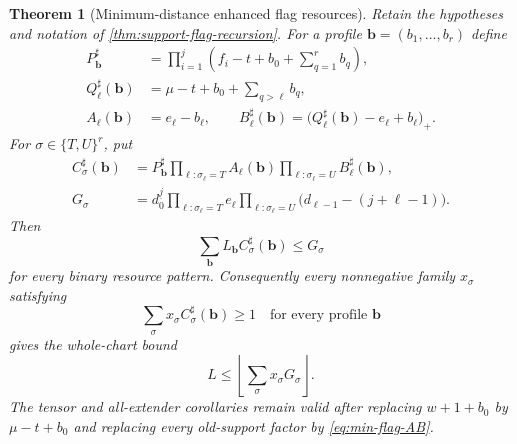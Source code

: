 \documentclass[11pt,a4paper]{amsart}
\numberwithin{equation}{section}
\newtheorem{theorem}{Theorem}[section]
\theoremstyle{remark}
\begin{document}
\begin{theorem}[Minimum-distance enhanced flag resources]
\label{thm:min-distance-flag-resources}
Retain the hypotheses and notation of \cref{thm:support-flag-recursion}.  For a profile $\mathbf b=(b_1,\ldots,b_r)$ define
\begin{align}
 P_{\mathbf b}^{\sharp}
 &=\prod_{i=1}^{j}
 \left(f_i-t+b_0+\sum_{q=1}^{r}b_q\right),\label{eq:min-flag-P}\\
 Q_{\ell}^{\sharp}(\mathbf b)
 &=\mu-t+b_0+\sum_{q>\ell}b_q,\label{eq:min-flag-Q}\\
 A_\ell(\mathbf b)&=e_\ell-b_\ell,
 \qquad
 B_{\ell}^{\sharp}(\mathbf b)
 =\bigl(Q_{\ell}^{\sharp}(\mathbf b)-e_\ell+b_\ell\bigr)_+ .\label{eq:min-flag-AB}
\end{align}
For $\sigma\in\{T,U\}^r$, put
\begin{align}
 C_{\sigma}^{\sharp}(\mathbf b)
 &=P_{\mathbf b}^{\sharp}
 \prod_{\ell:\sigma_\ell=T}A_\ell(\mathbf b)
 \prod_{\ell:\sigma_\ell=U}B_{\ell}^{\sharp}(\mathbf b),\label{eq:min-flag-C}\\
 G_\sigma
 &=d_0^{\underline j}
 \prod_{\ell:\sigma_\ell=T}e_\ell
 \prod_{\ell:\sigma_\ell=U}
 \bigl(d_{\ell-1}-(j+\ell-1)\bigr).\label{eq:min-flag-G}
\end{align}
Then
\begin{equation}
 \boxed{
 \sum_{\mathbf b}L_{\mathbf b}C_{\sigma}^{\sharp}(\mathbf b)
 \le G_\sigma
 }
 \label{eq:min-flag-resource}
\end{equation}
for every binary resource pattern.  Consequently every nonnegative family $x_\sigma$ satisfying
\[
 \sum_\sigma x_\sigma C_{\sigma}^{\sharp}(\mathbf b)\ge1
 \quad\text{for every profile }\mathbf b
\]
gives the whole-chart bound
\begin{equation}
 \boxed{
 L\le\left\lfloor\sum_\sigma x_\sigma G_\sigma\right\rfloor .
 }
 \label{eq:min-flag-dual}
\end{equation}
The tensor and all-extender corollaries remain valid after replacing $w+1+b_0$ by $\mu-t+b_0$ and replacing every old-support factor by \eqref{eq:min-flag-AB}.
\end{theorem}
\end{document}
